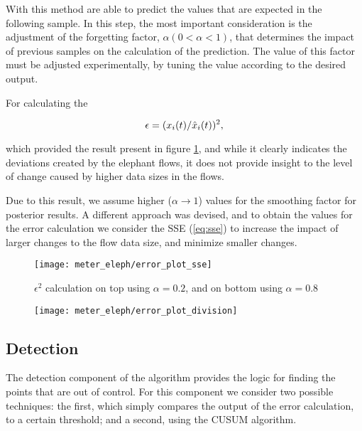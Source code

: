 \par With this method are able to predict the values that are expected in the following sample. In this step, the most important consideration is the adjustment of 
the forgetting factor, $\alpha (0 < \alpha < 1)$, that determines the impact of previous samples on the calculation of the prediction. The value of this factor must
be adjusted experimentally, by tuning the value according to the desired output.

\par For calculating the

\begin{equation}
    \centering
    \label{eq:division}
    \epsilon = (x_i(t)/\hat{x}_i(t))^2,
\end{equation}

\par which provided the result present in figure \ref{fig:error_plot_sse}, and while it clearly indicates the deviations created by the elephant flows, it 
does not provide insight to the level of change caused by higher data sizes in the flows.

Due to this result, we assume higher ($\alpha \rightarrow 1$) values for the smoothing factor for posterior results. A different approach was devised,
and to obtain the values for the error calculation we consider the SSE (\ref{eq:sse}) to increase the impact of larger changes to the flow data size,
and minimize smaller changes.

\begin{figure}[H]
    \texttt{[image: meter\_eleph/error\_plot\_sse]}
    \caption{$\epsilon^2$ calculation on top using $\alpha = 0.2$, and on bottom using $\alpha = 0.8$}
    \label{fig:error_plot_sse}
\end{figure}

\begin{figure}[H]
    \texttt{[image: meter\_eleph/error\_plot\_division]}
    \caption{}
    \label{fig:error_plot_division}
\end{figure}

\subsection{Detection}

The detection component of the algorithm provides the logic for finding the points that are out of control. For this component we consider two possible techniques:
the first, which simply compares the output of the error calculation, to a certain threshold; and a second, using the CUSUM algorithm. 

